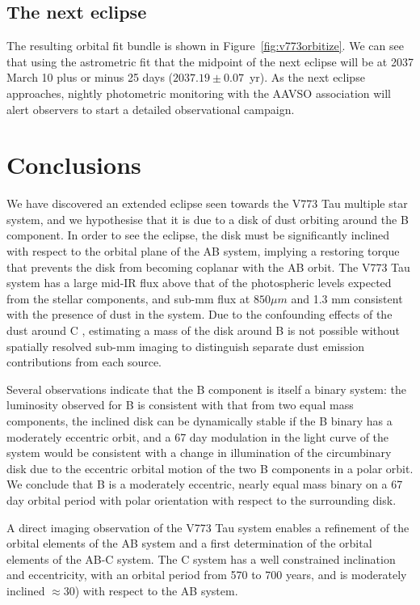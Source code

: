 \documentclass{aa}
\begin{document}
\subsection{The next eclipse}
The resulting orbital fit bundle is shown in Figure~\ref{fig:v773orbitize}.
%
We can see that using the astrometric fit that the midpoint of the next eclipse will be at 2037 March 10 plus or minus 25 days ($2037.19\pm0.07$\ yr).
%
As the next eclipse approaches, nightly photometric monitoring with the AAVSO association will alert observers to start a detailed observational campaign.

\section{Conclusions}\label{sec:conclusions}

We have discovered an extended eclipse seen towards the V773 Tau multiple star system, and we hypothesise that it is due to a disk of dust orbiting around the B component.
%
In order to see the eclipse, the disk must be significantly inclined with respect to the orbital plane of the AB system, implying a restoring torque that prevents the disk from becoming coplanar with the AB orbit.
%
The V773 Tau system has a large mid-IR flux \citep{Prusti92,Duchene03,2007AAS...211.2904P}  above that of the photospheric levels expected from the stellar components, and sub-mm flux at $850 \mu m$ and 1.3 mm \citep{Andrews05} consistent with the presence of dust in the system.
%
Due to the confounding effects of the dust around C \citep{Duchene03,Woitas03}, estimating a mass of the disk around B is not possible without spatially resolved sub-mm imaging to distinguish separate dust emission contributions from each source.

Several observations indicate that the B component is itself a binary system: the luminosity observed for B is consistent with that from two equal mass components, the inclined disk can be dynamically stable if the B binary has a moderately eccentric orbit, and a 67 day modulation in the light curve of the system would be consistent with a change in illumination of the circumbinary disk due to the eccentric orbital motion of the two B components in a polar orbit.
%
We conclude that B is a moderately eccentric, nearly equal mass binary on a 67 day orbital period with polar orientation with respect to the surrounding disk.

A direct imaging observation of the V773 Tau system enables a refinement of the orbital elements of the AB system and a first determination of the orbital elements of the AB-C system.
%
The C system has a well constrained inclination and eccentricity, with an orbital period from 570 to 700 years, and is moderately inclined $\approx 30$\degr{}) with respect to the AB system.
\end{document}
